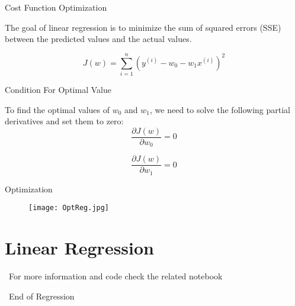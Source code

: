 \documentclass[serif, aspectratio=169]{beamer}
\begin{document}
\begin{frame}{Cost Function Optimization}
    \item The goal of linear regression is to minimize the sum of squared errors (SSE) between the predicted values and the actual values.
    
    \begin{equation}
    J(w) = \sum_{i=1}^{n} \left( y^{(i)} - w_0 - w_1 x^{(i)} \right)^2
    \end{equation}
\end{frame}

\begin{frame}{Condition For Optimal Value}
    \item To find the optimal values of $w_0$ and $w_1$, we need to solve the following partial derivatives and set them to zero:
    \begin{equation}
    \frac{\partial J(w)}{\partial w_0} = 0
    \end{equation}

    \begin{equation}
    \frac{\partial J(w)}{\partial w_1} = 0
    \end{equation}
\end{frame}

\begin{frame}{Optimization}
    \begin{figure}[h]
        \centering
        \texttt{[image: OptReg.jpg]} 
    \end{figure}
\end{frame}

\section{Linear Regression}


\begin{frame}
    \begin{center}
        {\Huge\ \color{red}For more information and code check the related notebook}
    \end{center}
\end{frame}


\begin{frame}
    \begin{center}
        {\Huge\ End of Regression}
    \end{center}
\end{frame}
\end{document}
